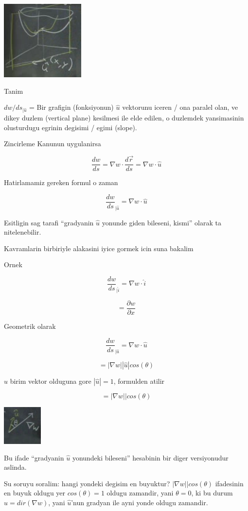 \documentclass[12pt,fleqn]{article}
\begin{document}
\includegraphics[height=4cm]{12_7.png}

Tanim

$dw / ds_{|\hat{u}}$ = Bir grafigin (fonksiyonun) $\hat{u}$ vektorunu
iceren / ona paralel olan, ve dikey duzlem (vertical plane) kesilmesi ile
elde edilen, o duzlemdek yansimasinin olusturdugu egrinin degisimi / egimi
(slope).

Zincirleme Kanunun uygulanirsa

\[ \frac{dw}{ds} = \nabla w \cdot \frac{d\vec{r}}{ds} 
= \nabla w \cdot \hat{u}
\]

Hatirlamamiz gereken formul o zaman

\[ \frac{dw}{ds}_{|\hat{u}} =  \nabla w \cdot \hat{u} \]


Esitligin sag tarafi ``gradyanin $\hat{u}$ yonunde giden bileseni, kismi''
olarak ta nitelenebilir. 

Kavramlarin birbiriyle alakasini iyice gormek icin suna bakalim

Ornek

\[ \frac{dw}{ds}_{|\hat{i}} =  \nabla w \cdot \hat{i} \]

\[ = \frac{\partial w}{\partial x} \]

Geometrik olarak

\[ \frac{dw}{ds}_{|\hat{u}} =  \nabla w \cdot \hat{u} \]

\[ =  |\nabla w||\hat{u}|cos(\theta)  \]

$\hat{u}$ birim vektor olduguna gore $|\hat{u}| = 1$, formulden atilir

\[ =  |\nabla w||cos(\theta)  \]

\includegraphics[height=2cm]{12_8.png}

Bu ifade ``gradyanin $\hat{u}$ yonundeki bileseni'' hesabinin bir diger
versiyonudur aslinda. 

Su soruyu soralim: hangi yondeki degisim en buyuktur? $|\nabla
w||cos(\theta)$ ifadesinin
en buyuk oldugu yer $cos(\theta)=1$ oldugu zamandir, yani $\theta = 0$, ki
bu durum $\hat{u} = dir(\nabla w)$, yani $\hat{u}$'nun gradyan ile ayni
yonde oldugu zamandir. 
\end{document}
